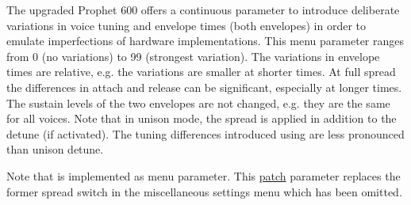 The upgraded Prophet 600 offers a continuous parameter to introduce deliberate variations in voice tuning and envelope times (both envelopes) in  order to emulate imperfections of hardware implementations. This menu parameter \vintage ranges from 0 (no variations) to 99 (strongest variation). The variations in envelope times are relative, e.g. the variations are smaller at shorter times. At full spread the differences in attach and release can be significant, especially at longer times. The sustain levels of the two envelopes are not changed, e.g. they are the same for all voices. Note that in unison mode, the spread is applied in addition to the detune (if activated). The tuning differences introduced using \vintage are less pronounced than unison detune.

Note that \vintage is implemented as menu parameter. This \underline{patch} parameter replaces the former spread switch in the miscellaneous settings menu which has been omitted.
